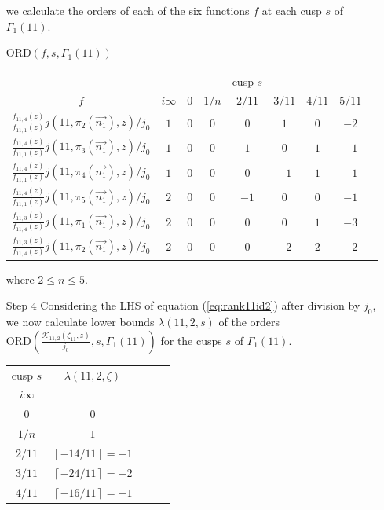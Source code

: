 \documentclass[12pt]{amsart}
\theoremstyle{definition}
\theoremstyle{remark}
\numberwithin{equation}{section}
\newcommand\CL[1]{\left\lceil#1\right\rceil}
\newcommand\ORD{\mbox{ORD}}
\newcommand\eqn[1]{(\ref{eq:#1})}
\begin{document}
\begin{enumerate}
 we calculate the orders of each of the six functions $f$ at each cusp 
$s$ of $\Gamma_1(11)$.
\begin{center}
$\ORD(f ,s,\Gamma_1(11))$\\
\begin{tabular}{c c c c c c c c c}\\
&&&& cusp $s$  \\
$f$ & $i\infty$ & $0$ & $1/n$ & $2/11$ & $3/11$ & $4/11$ & $5/11$  \\
$\frac{f_{11,4}(z)}{f_{11,1}(z)}j(11,\pi_2(\overrightarrow{n_1}),z)/j_0$ &  $1$  & $0$ & $0$   & $0$    & $1$    &  $0$   &  $-2$   \\
$\frac{f_{11,4}(z)}{f_{11,1}(z)}j(11,\pi_3(\overrightarrow{n_1}),z)/j_0$ &  $1$  & $0$ & $0$   & $1$    & $0$    &  $1$   &  $-1$   \\
$\frac{f_{11,4}(z)}{f_{11,1}(z)}j(11,\pi_4(\overrightarrow{n_1}),z)/j_0$ &  $1$  & $0$ & $0$   & $0$    & $-1$   &  $1$   &  $-1$   \\
$\frac{f_{11,4}(z)}{f_{11,1}(z)}j(11,\pi_5(\overrightarrow{n_1}),z)/j_0$ &  $2$  & $0$ & $0$   & $-1$   & $0$    &  $0$   &  $-1$   \\
$\frac{f_{11,3}(z)}{f_{11,4}(z)}j(11,\pi_1(\overrightarrow{n_1}),z)/j_0$ &  $2$  & $0$ & $0$   & $0$    & $0$    &  $1$   &  $-3$   \\
$\frac{f_{11,3}(z)}{f_{11,4}(z)}j(11,\pi_2(\overrightarrow{n_1}),z)/j_0$ &  $2$  & $0$ & $0$   & $0$    & $-2$   &  $2$   &  $-2$               
\end{tabular}
\end{center}
where $2\le n\le 5$.
\item[Step 4] Considering the LHS of equation \eqn{rank11id2}
after division by $j_0$, 
we now calculate lower bounds $\lambda(11,2,s)$ of 
the  orders 
$\ORD\left(\frac{\mathcal{K}_{11,2}(\zeta_{11},z)}{j_0},s,\Gamma_1(11)\right)$
for the cusps $s$ of $\Gamma_1(11)$.
\begin{center}
\begin{tabular}{c c c c c}
cusp $s$ & $\lambda(11,2,\zeta)$     \\
$i\infty$    &                     \\
$0$          &   $0$               \\
$1/n$        &   $1$               \\
$2/11$       &   $\CL{-14/11}=-1$  \\
$3/11$       &   $\CL{-24/11}=-2$  \\
$4/11$       &   $\CL{-16/11}=-1$  \\

\end{tabular}
\end{center}
\end{enumerate}
\end{document}
